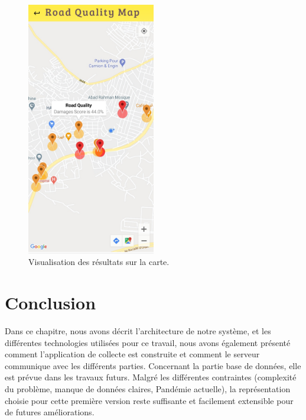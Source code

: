 \newpage
\begin{figure}[h!]
    \center
    \includegraphics[width=0.50\textwidth]{Images/recordingApp/seeMap.jpg}
    \caption{Visualisation des résultats sur la carte.}
    \label{seeMap}
  \end{figure} 



\section{Conclusion}
Dans ce chapitre, nous avons décrit l'architecture de notre système, et les différentes technologies utilisées pour ce travail, nous avons également présenté comment l'application de collecte est construite et comment le serveur communique avec les différents parties. Concernant la partie base de données, elle est prévue dans les travaux futurs. Malgré les différentes contraintes (complexité du problème, manque de données claires, Pandémie actuelle), la représentation choisie pour cette première version reste suffisante et facilement extensible pour de futures améliorations.



